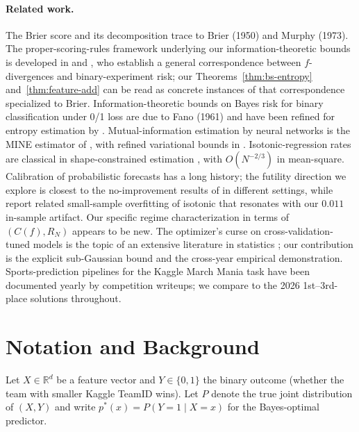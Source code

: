 \documentclass[11pt,a4paper]{article}
\theoremstyle{definition}
\newcommand{\R}{\mathbb{R}}
\begin{document}
\paragraph{Related work.}
The Brier score and its decomposition trace to Brier (1950) and Murphy (1973). The proper-scoring-rules framework underlying our information-theoretic bounds is developed in \citet{bujastuetzleshen2005} and \citet{reidwilliamson2011}, who establish a general correspondence between $f$-divergences and binary-experiment risk; our Theorems~\ref{thm:bs-entropy} and~\ref{thm:feature-add} can be read as concrete instances of that correspondence specialized to Brier. Information-theoretic bounds on Bayes risk for binary classification under 0/1 loss are due to Fano (1961) and have been refined for entropy estimation by \citet{kearns1999, antos1999}. Mutual-information estimation by neural networks is the MINE estimator of \citet{belghazi2018}, with refined variational bounds in \citet{poole2019}. Isotonic-regression rates are classical in shape-constrained estimation \citep{vandegeer1990, mammen1995, zhang2002}, with $O(N^{-2/3})$ in mean-square. Calibration of probabilistic forecasts has a long history; the futility direction we explore is closest to the no-improvement results of \citet{platt1999, niculescu2005} in different settings, while \citet{kumarliangma2019} report related small-sample overfitting of isotonic that resonates with our $0.011$ in-sample artifact. Our specific regime characterization in terms of $(C(f), R_N)$ appears to be new. The optimizer's curse on cross-validation-tuned models is the topic of an extensive literature in statistics \citep{cawley2010, varma2006, dudoit2005}; our contribution is the explicit sub-Gaussian bound and the cross-year empirical demonstration. Sports-prediction pipelines for the Kaggle March Mania task have been documented yearly by competition writeups; we compare to the 2026 1st--3rd-place solutions throughout.

\section{Notation and Background}\label{sec:notation}

Let $X \in \R^d$ be a feature vector and $Y \in \{0, 1\}$ the binary outcome (whether the team with smaller Kaggle TeamID wins). Let $P$ denote the true joint distribution of $(X, Y)$ and write $p^*(x) = P(Y = 1 \mid X = x)$ for the Bayes-optimal predictor.
\end{document}
